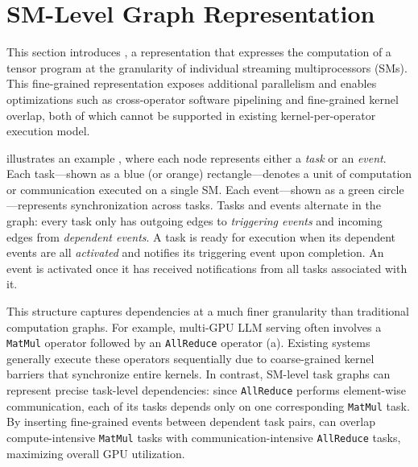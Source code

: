 \section{SM-Level Graph Representation}
\label{sec:task_graph}

This section introduces {\em \graph}, a representation that expresses the computation of a tensor program at the granularity of individual streaming multiprocessors (SMs). This fine-grained representation exposes additional parallelism and enables optimizations such as cross-operator software pipelining and fine-grained kernel overlap, both of which cannot be supported in existing kernel-per-operator execution model.


 illustrates an example \graph, where each node represents either a {\em task} or an {\em event}. Each task---shown as a blue (or orange) rectangle---denotes a unit of computation or communication executed on a single SM. Each event—shown as a green circle—represents synchronization across tasks. Tasks and events alternate in the graph: every task only has outgoing edges to {\em triggering events} and incoming edges from {\em dependent events}. A task is ready for execution when its dependent events are all {\em activated} and notifies its triggering event upon completion. An event is activated once it has received notifications from all tasks associated with it.

This structure captures dependencies at a much finer granularity than traditional computation graphs. For example, multi-GPU LLM serving often involves a {\tt MatMul} operator followed by an {\tt AllReduce} operator (a). Existing systems generally execute these operators sequentially due to coarse-grained kernel barriers that synchronize entire kernels. In contrast, SM-level task graphs can represent precise task-level dependencies: since {\tt AllReduce} performs element-wise communication, each of its tasks depends only on one corresponding {\tt MatMul} task. By inserting fine-grained events between dependent task pairs, \sys can overlap compute-intensive {\tt MatMul} tasks with communication-intensive {\tt AllReduce} tasks, maximizing overall GPU utilization.

